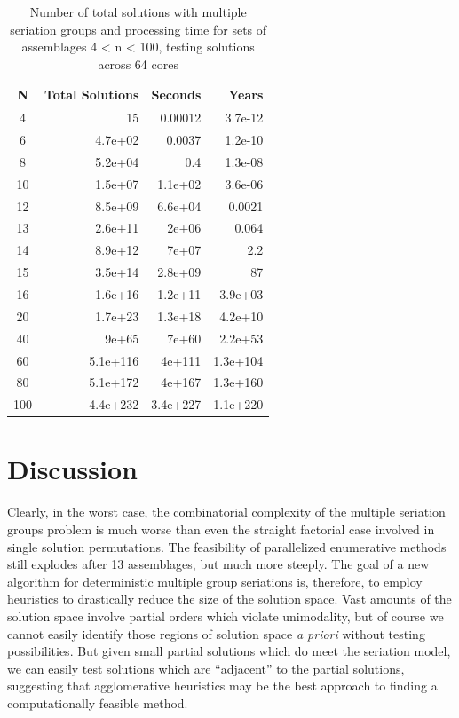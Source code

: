 \begin{table}[ht]
\centering
\begin{tabular}{|c|r|r|r|}
  \hline
N & Total Solutions & Seconds & Years \\ 
  \hline
  4 &  15 & 0.00012 & 3.7e-12 \\ 
    6 & 4.7e+02 & 0.0037 & 1.2e-10 \\ 
    8 & 5.2e+04 & 0.4 & 1.3e-08 \\ 
   10 & 1.5e+07 & 1.1e+02 & 3.6e-06 \\ 
   12 & 8.5e+09 & 6.6e+04 & 0.0021 \\ 
   13 & 2.6e+11 & 2e+06 & 0.064 \\ 
   14 & 8.9e+12 & 7e+07 & 2.2 \\ 
   15 & 3.5e+14 & 2.8e+09 &  87 \\ 
   16 & 1.6e+16 & 1.2e+11 & 3.9e+03 \\ 
   20 & 1.7e+23 & 1.3e+18 & 4.2e+10 \\ 
   40 & 9e+65 & 7e+60 & 2.2e+53 \\ 
   60 & 5.1e+116 & 4e+111 & 1.3e+104 \\ 
   80 & 5.1e+172 & 4e+167 & 1.3e+160 \\ 
  100 & 4.4e+232 & 3.4e+227 & 1.1e+220 \\ 
   \hline
\end{tabular}
\caption{Number of total solutions with multiple seriation groups and processing time for sets of assemblages 4 < n < 100, testing solutions across 64 cores} 
\label{tab:total-mult}
\end{table}





\section{Discussion}
\label{sec:conclusions}

Clearly, in the worst case, the combinatorial complexity of the multiple seriation groups problem is much worse than even the straight factorial case involved in single solution permutations.  The feasibility of parallelized enumerative methods still explodes after 13 assemblages, but much more steeply.  The goal of a new algorithm for deterministic multiple group seriations is, therefore, to employ heuristics to drastically reduce the size of the solution space.  Vast amounts of the solution space involve partial orders which violate unimodality, but of course we cannot easily identify those regions of solution space \emph{a priori} without testing possibilities.  But given small partial solutions which do meet the seriation model, we can easily test solutions which are ``adjacent'' to the partial solutions, suggesting that agglomerative heuristics may be the best approach to finding a computationally feasible method.  


